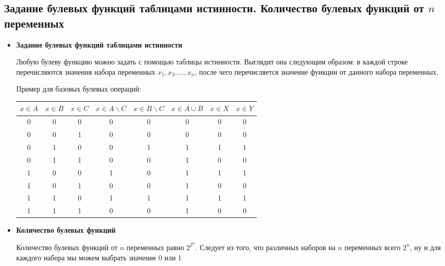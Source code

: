 \subsection{Задание булевых функций таблицами истинности. Количество булевых функций от $n$ переменных}

\begin{itemize}
	\item \textbf{Задание булевых функций таблицами истинности}

	Любую булеву функцию можно задать с помощью таблицы истинности. Выглядит она следующим образом: в каждой строке перечисляются значения набора переменных $x_1, x_2, \ldots, x_n$, после чего перечисляется значение функции от данного набора переменных.
	
	Пример для базовых булевых операций:

   \begin{tabular}{|c|c|c|c|c|c|c|c|}
       \hline
       $x \in A$ & $x \in B$ & $x \in C$ & $x \in A \backslash C$ & $x \in B \backslash C$ & $x \in A \cup B$ & $x \in X$ & $x \in Y$ \\
       \hline
       0 & 0 & 0 & 0 & 0 & 0 & 0 & 0 \\
       \hline
       0 & 0 & 1 & 0 & 0 & 0 & 0 & 0 \\
       \hline
       0 & 1 & 0 & 0 & 1 & 1 & 1 & 1 \\
       \hline
       0 & 1 & 1 & 0 & 0 & 1 & 0 & 0 \\
       \hline
       1 & 0 & 0 & 1 & 0 & 1 & 1 & 1 \\
       \hline
       1 & 0 & 1 & 0 & 0 & 1 & 0 & 0 \\
       \hline
       1 & 1 & 0 & 1 & 1 & 1 & 1 & 1 \\
       \hline
       1 & 1 & 1 & 0 & 0 & 1 & 0 & 0 \\
       \hline
   \end{tabular}

	\item \textbf{Количество булевых функций}
	
	Количество булевых функций от $n$ переменных равно $2^{2^n}$. Следует из того, что различных наборов на $n$ переменных всего $2^n$, ну и для каждого набора мы можем выбрать значение 0 или 1
\end{itemize}